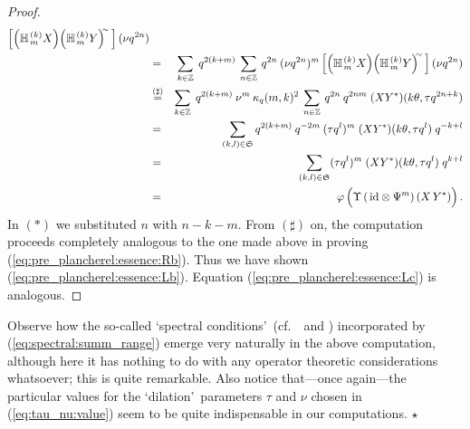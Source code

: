 \begin{proof}
\begin{eqnarray*}
    \left[ \left(\YaH{m}{k}X\right) \! \left(\YaH{m}{k}Y\right)^{\!\!\sim}\,
    \right] (\nu q^{2n})
\\ &=&
    \sum_{k \in\ZZ}  \; q^{2(k+m)} \:
    \sum_{n\in\ZZ} \: q^{2n} \: (\nu q^{2n})^m
    \left[ \left(\YaH{m}{k}X\right) \! \left(\YaH{m}{k}Y\right)^{\!\!\sim}\,
    \right] (\nu q^{2n})
\\ &\stackrel{(\sharp)}{=}&
    \sum_{k\in\ZZ} \; q^{2(k+m)} \: \nu^m \: \kq(m,k)^2 \:
    \sum_{n\in\ZZ} \:  q^{2n} \: q^{2nm} \;  (X Y^*)(k\theta, \tau q^{2n+k})
\\ &=&
    \!\!  \sum_{(k,l)\in\mathfrak{S}} q^{2(k+m)} \:  q^{-2m} \: (\tau q^l)^m \;
    (X Y^*)(k\theta, \tau q^l) \; q^{-k+l}
\\ &=&
    \!\! \sum_{(k,l)\in\mathfrak{S}} (\tau q^l)^m \;
          (X Y^*)(k\theta, \tau q^l) \; q^{k+l}
\\ &=&
    \varphi \left(\Upsilon\left(\,\id \tens \Psi^m \right)(X \, Y^*) \vertL\right).
\end{eqnarray*}
In $(*)$ we substituted $n$ with $n-k-m$. From $(\sharp)$ on, the computation
proceeds completely analogous to the one made above in proving
(\ref{eq:pre_plancherel:essence:Rb}).
Thus we have shown (\ref{eq:pre_plancherel:essence:Lb}).
Equation (\ref{eq:pre_plancherel:essence:Lc}) is analogous.
\end{proof}



\begin{remark} \rm
Observe how the so-called \lq spectral conditions\rq\
(cf.\ \mbox{\cite[remark 3.4.1.9]{Jeroen:QE2:haar}}\ and \cite{Wor:QE2,Wor:Affiliated})
incorporated by (\ref{eq:spectral:summ_range}) emerge very naturally in the above
computation, although here it has nothing to do with any operator theoretic
considerations whatsoever; this is quite remarkable.
Also notice that---once again---the particular values for the
\lq dilation\rq\ parameters $\tau$ and $\nu$ chosen in (\ref{eq:tau_nu:value}) seem
to be quite indispensable in our computations.
\hfill $\star$
\end{remark}


